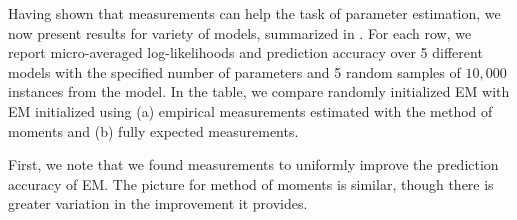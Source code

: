 Having shown that measurements can help the task of parameter estimation, we
now present results for variety of models, summarized in . 
For each row, we report micro-averaged log-likelihoods and prediction accuracy
over 5 different models with the specified number of parameters and 5 random
samples of $10,000$ instances from the model. 
In the table, we compare randomly initialized EM with EM initialized using (a)
empirical measurements estimated with the method of moments and (b) fully
expected measurements.

First, we note that we found measurements to uniformly improve the prediction
accuracy of EM. The picture for method of moments is similar, though there is
greater variation in the improvement it provides.


% 
% 
% 
% 
% 
% 
% 
% 
% 
% 
% 
% 
